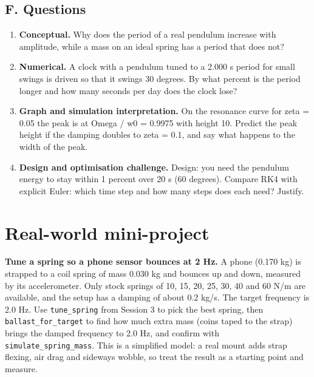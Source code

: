 \documentclass[11pt,a4paper]{article}
\begin{document}
\subsection*{F. Questions}
\begin{enumerate}[nosep]
\item \textbf{Conceptual.} Why does the period of a real pendulum increase with amplitude, while a mass on an ideal spring has a period that does not?
\item \textbf{Numerical.} A clock with a pendulum tuned to a 2.000 s period for small swings is driven so that it swings 30 degrees. By what percent is the period longer and how many seconds per day does the clock lose?
\item \textbf{Graph and simulation interpretation.} On the resonance curve for zeta = 0.05 the peak is at Omega / w0 = 0.9975 with height 10. Predict the peak height if the damping doubles to zeta = 0.1, and say what happens to the width of the peak.
\item \textbf{Design and optimisation challenge.} Design: you need the pendulum energy to stay within 1 percent over 20 s (60 degrees). Compare RK4 with explicit Euler: which time step and how many steps does each need? Justify.
\end{enumerate}

\section{Real-world mini-project}
\textbf{Tune a spring so a phone sensor bounces at 2 Hz.} A phone (0.170 kg) is strapped to a coil spring of mass 0.030 kg and bounces up and down, measured by its accelerometer. Only stock springs of 10, 15, 20, 25, 30, 40 and 60 N/m are available, and the setup has a damping of about 0.2 kg/s. The target frequency is 2.0 Hz. Use \texttt{tune\_spring} from Session 3 to pick the best spring, then \texttt{ballast\_for\_target} to find how much extra mass (coins taped to the strap) brings the damped frequency to 2.0 Hz, and confirm with \texttt{simulate\_spring\_mass}. This is a simplified model: a real mount adds strap flexing, air drag and sideways wobble, so treat the result as a starting point and measure.
\end{document}
